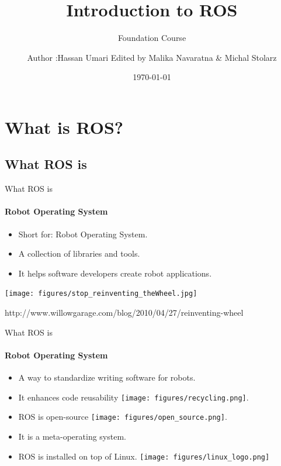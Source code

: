 \documentclass{beamer}
\author[MAS]{Author :Hassan Umari Edited by Malika Navaratna \& Michal Stolarz}
\title{Introduction to ROS}
\subtitle{Foundation Course}
\institute[HBRS]{Hochschule Bonn-Rhein-Sieg}
\date{\today}
\begin{document}
{
\begin{frame}
\titlepage
\end{frame}
}


\section{What is ROS?}


\subsection{What ROS is}
\begin{frame}{What ROS is}
\framesubtitle{Robot Operating System}
    \begin{itemize}
        \item Short for: Robot Operating System.
        \item A collection of libraries and tools.
        \item It helps software developers create robot
        applications. 
    \end{itemize}
\end{frame}



\begin{frame}[plain]{}
    \centering
    \texttt{[image: figures/stop\_reinventing\_theWheel.jpg]}
    
\tiny{http://www.willowgarage.com/blog/2010/04/27/reinventing-wheel}
\end{frame}


\begin{frame}{What ROS is}
    \framesubtitle{Robot Operating System}
    \begin{itemize}
        \item A way to standardize writing software for robots.
        \item It enhances {\huge code reusability} \texttt{[image: figures/recycling.png]}.
        \item ROS is open-source \texttt{[image: figures/open\_source.png]}.
        \item It is a meta-operating system.
        \item ROS is installed on top of Linux.  \texttt{[image: figures/linux\_logo.png]}

    \end{itemize}
    
\end{frame}
\end{document}
